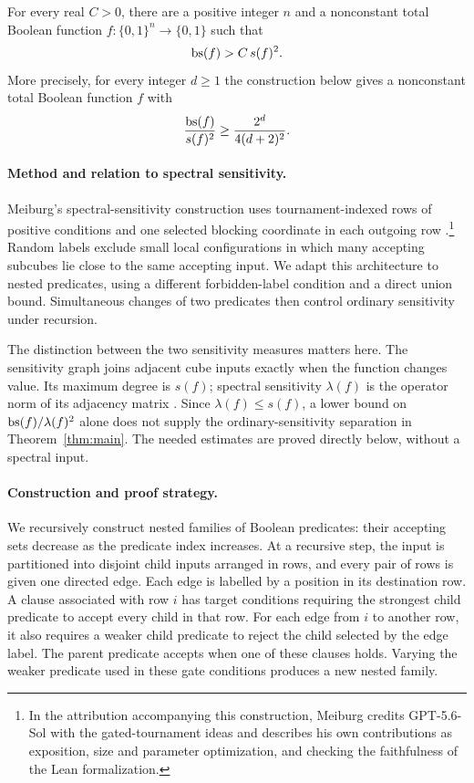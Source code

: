 \begin{theorem}\label{thm:main}
For every real \(C>0\), there are a positive integer \(n\) and a
nonconstant total Boolean function \(f:\{0,1\}^n\to\{0,1\}\) such that
\[
 \operatorname{bs}(f)>C\,s(f)^2.
\]
More precisely, for every integer \(d\ge1\) the construction below gives
a nonconstant total Boolean function \(f\) with
\[
 \frac{\operatorname{bs}(f)}{s(f)^2}\ge \frac{2^d}{4(d+2)^2}.
\]
\end{theorem}

\paragraph{Method and relation to spectral sensitivity.}
Meiburg's spectral-sensitivity construction uses tournament-indexed rows
of positive conditions and one selected blocking coordinate in each
outgoing row \cite[Sections~3.1 and~5.2--5.5]{Meiburg2026}.\footnote{In the
attribution accompanying this construction, Meiburg credits GPT-5.6-Sol
with the gated-tournament ideas and describes his own contributions as
exposition, size and parameter optimization, and checking the faithfulness
of the Lean formalization.}
Random labels exclude small local configurations in which many accepting
subcubes lie close to the same accepting input. We adapt this architecture
to nested predicates, using a different forbidden-label condition and a
direct union bound. Simultaneous changes of two predicates then control
ordinary sensitivity under recursion.

The distinction between the two sensitivity measures matters here.
The sensitivity graph joins adjacent cube inputs exactly when the function
changes value. Its maximum degree is \(s(f)\); spectral sensitivity
\(\lambda(f)\) is the operator norm of its adjacency matrix
\cite{AaronsonEtAl2021}.
Since \(\lambda(f)\le s(f)\), a lower bound on
\(\operatorname{bs}(f)/\lambda(f)^2\) alone does not supply the ordinary-sensitivity
separation in Theorem~\ref{thm:main}.
The needed estimates are proved directly below, without a spectral input.

\paragraph{Construction and proof strategy.}
We recursively construct nested families of Boolean predicates: their
accepting sets decrease as the predicate index increases. At a recursive
step, the input is partitioned into disjoint child inputs arranged in
rows, and every pair of rows is given one directed edge. Each edge is
labelled by a position in its destination row. A clause associated with
row \(i\) has target conditions requiring the strongest child predicate
to accept every child in that row. For each edge from \(i\) to another row,
it also requires a weaker child predicate to reject the child selected by
the edge label. The parent predicate accepts when one of these clauses
holds. Varying the weaker predicate used in these gate conditions produces
a new nested family.

